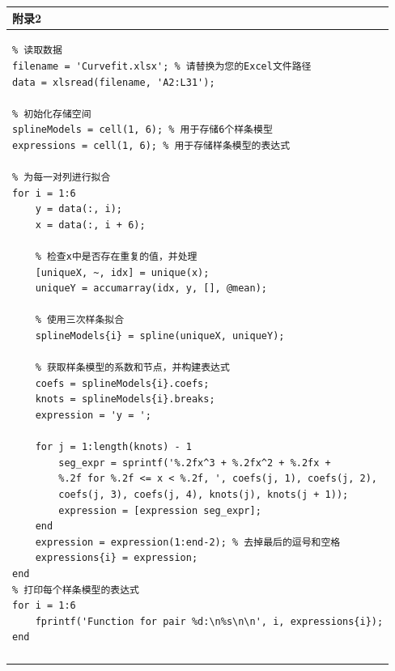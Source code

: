 \documentclass{my_paper}
\begin{document}
  \begin{table}[H]
    \centering
    \begin{tabular}{|p{14.0cm}|}
    \hline
    \textbf{附录2} \\ 
    \hline
\begin{lstlisting}
% 读取数据
filename = 'Curvefit.xlsx'; % 请替换为您的Excel文件路径
data = xlsread(filename, 'A2:L31');

% 初始化存储空间
splineModels = cell(1, 6); % 用于存储6个样条模型
expressions = cell(1, 6); % 用于存储样条模型的表达式

% 为每一对列进行拟合
for i = 1:6
    y = data(:, i);
    x = data(:, i + 6);
    
    % 检查x中是否存在重复的值，并处理
    [uniqueX, ~, idx] = unique(x);
    uniqueY = accumarray(idx, y, [], @mean);
    
    % 使用三次样条拟合
    splineModels{i} = spline(uniqueX, uniqueY);
    
    % 获取样条模型的系数和节点，并构建表达式
    coefs = splineModels{i}.coefs;
    knots = splineModels{i}.breaks;
    expression = 'y = ';
    
    for j = 1:length(knots) - 1
        seg_expr = sprintf('%.2fx^3 + %.2fx^2 + %.2fx + 
        %.2f for %.2f <= x < %.2f, ', coefs(j, 1), coefs(j, 2), 
        coefs(j, 3), coefs(j, 4), knots(j), knots(j + 1));
        expression = [expression seg_expr];
    end
    expression = expression(1:end-2); % 去掉最后的逗号和空格
    expressions{i} = expression;
end
% 打印每个样条模型的表达式
for i = 1:6
    fprintf('Function for pair %d:\n%s\n\n', i, expressions{i});
end

\end{lstlisting}
    \\
    \\
\hline
    \end{tabular}
\end{table}\newpage
\end{document}
